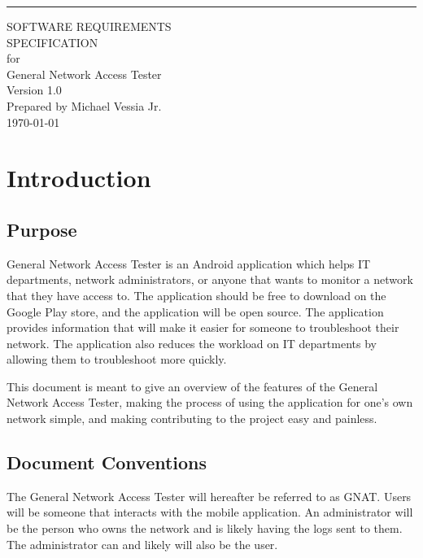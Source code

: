 \documentclass{scrreprt}
\date{}
\def\version{1.0}
\def\author{Michael Vessia Jr.}
\begin{document}
\begin{flushright}
  \rule{16cm}{5pt}\vskip1cm
  \begin{bfseries}
    \Huge{SOFTWARE REQUIREMENTS\\ SPECIFICATION}\\
    \vspace{1.9cm}
    for\\
    \vspace{1.9cm}
    General Network Access Tester\\
    \vspace{1.9cm}
    \LARGE{Version \version}\\
    \vspace{1.9cm}
    Prepared by \author\\
    \vspace{1.9cm}
    \today\\
  \end{bfseries}
\end{flushright}

\tableofcontents

\chapter{Introduction}

\section{Purpose}

General Network Access Tester is an Android application which helps IT departments, network administrators, or anyone that wants to monitor a network that they have access to. The application should be free to download on the Google Play store, and the application will be open source. The application provides information that will make it easier for someone to troubleshoot their network.  The application also reduces the workload on IT departments by allowing them to troubleshoot more quickly.

This document is meant to give an overview of the features of the General Network Access Tester, making the process of using the application for one's own network simple, and making contributing to the project easy and painless.

\section{Document Conventions}
The General Network Access Tester will hereafter be referred to as GNAT\@. Users will be someone that interacts with the mobile application.  An administrator will be the person who owns the network and is likely having the logs sent to them.  The administrator can and likely will also be the user.
\end{document}
